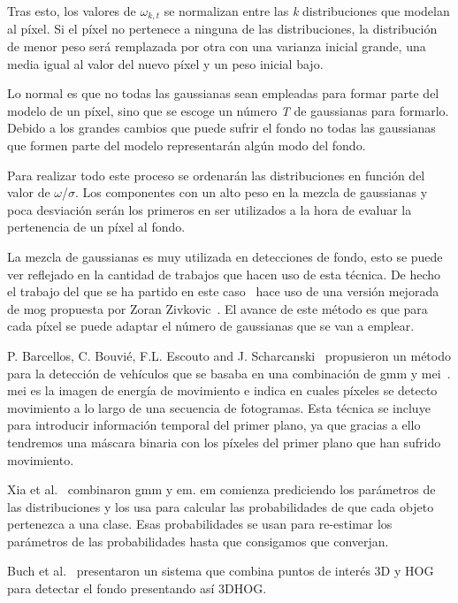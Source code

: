 Tras esto, los valores de $\omega_{k,t}$ se normalizan entre las \textit{k} distribuciones que modelan al píxel. Si  el píxel  no  pertenece  a  ninguna  de  las  distribuciones,  la  distribución  de menor peso será remplazada por otra con una varianza inicial grande, una media igual al valor del nuevo píxel y un peso inicial bajo.

Lo normal es que no todas las gaussianas sean empleadas para formar parte del modelo de un píxel, sino que se escoge un número \textit{T} de gaussianas para formarlo. Debido a los grandes cambios que puede sufrir el fondo no todas las gaussianas que formen parte del modelo representarán algún modo del fondo.

Para realizar todo este proceso se ordenarán las distribuciones en función del valor de $\omega$/$\sigma$. Los componentes con un alto peso en la mezcla de gaussianas y poca desviación serán los primeros en ser utilizados a la hora de evaluar la pertenencia de un píxel al fondo.

La mezcla de gaussianas es muy utilizada en detecciones de fondo, esto se puede ver reflejado en la cantidad de trabajos que hacen uso de esta técnica. De hecho el trabajo del que se ha partido en este caso~\cite{redo_tesis} hace uso de una versión mejorada de \acrshort{mog} propuesta por Zoran Zivkovic~\cite{zoran_zivkovic}. El avance de este método es que para cada píxel se puede adaptar el número de gaussianas que se van a emplear.


P. Barcellos, C. Bouvié, F.L. Escouto and  J. Scharcanski~\cite{gmm_mei_article} propusieron un método para la detección de vehículos que se basaba en una combinación de \acrfull{gmm} y \acrfull{mei}~\cite{mei_article}. \acrshort{mei} es la imagen de energía de movimiento e indica en cuales píxeles se detecto movimiento a lo largo de una secuencia de fotogramas. Esta técnica se incluye para introducir información temporal del primer plano, ya que gracias a ello tendremos una máscara binaria con los píxeles del primer plano que han sufrido movimiento.

Xia et al.~\cite{gmm_em_article} combinaron \acrshort{gmm} y \acrfull{em}. \acrshort{em} comienza prediciendo los parámetros de las distribuciones y los usa para calcular las probabilidades de que cada objeto pertenezca a una clase. Esas probabilidades se usan para re-estimar los parámetros de las probabilidades hasta que consigamos que converjan. 

Buch et al.~\cite{3dhog_article}  presentaron un sistema que combina  puntos de interés 3D y HOG para detectar el fondo presentando así 3DHOG.


